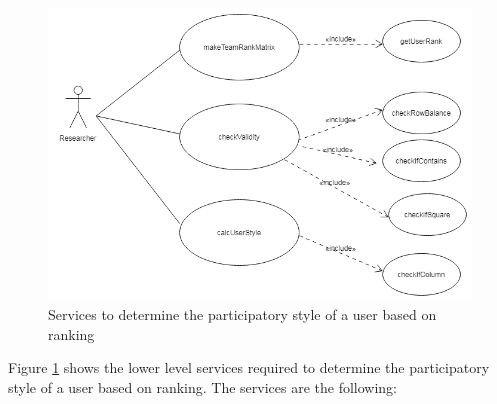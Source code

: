 \begin{figure}[htb]
\begin{center}
  \includegraphics[width=\textwidth,keepaspectratio=true]{rank_functionalRequirements}
\end{center}
\caption{Services to determine the participatory style of a user based on ranking \label{fig:rank_functionalRequirements}}
\end{figure}

Figure \ref{fig:rank_functionalRequirements} shows the lower level services required to determine the participatory style of a user based on ranking. The services are the following:

